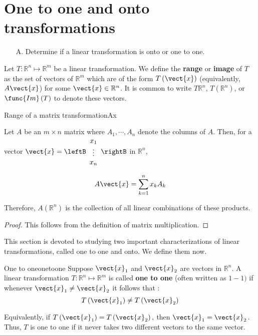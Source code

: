 \section{One to one and onto transformations}

\begin{outcome}
\begin{enumerate}
\item[A.]  Determine if a linear transformation is onto or one to one.
\end{enumerate}
\end{outcome}

Let $T: \mathbb{R}^n \mapsto \mathbb{R}^m$ be a linear transformation. We define the \textbf{range} or \textbf{image} of $T$ as the set of vectors of $\mathbb{R}^{m}$ which are of the form
$T \left(\vect{x}\right)$ (equivalently, $A\vect{x}$) for some $\vect{x}\in \mathbb{R}^{n}$. It is common
to write $T\mathbb{R}^{n}$, $T\left( \mathbb{R}^{n}\right)$, or
$\func{Im}\left( T\right) $ to denote these vectors.  

\begin{lemma}{Range of a matrix transformation}{Ax}

Let $A$ be an $m\times n$ matrix where $A_{1},\cdots , A_{n}$ denote the columns of
$A$. Then, for a vector $\vect{x}=\leftB 
\begin{array}{c}
x_{1} \\
\vdots \\
 x_{n}
\end{array}
\rightB$ in $\mathbb{R}^n$,

\begin{equation*}
A\vect{x}=\sum_{k=1}^{n}x_{k}A_{k}
\end{equation*}

Therefore, $A \left( \mathbb{R}^n \right)$ is the collection of all
linear combinations of these products.
\end{lemma}

\begin{proof}
This follows from the definition of matrix multiplication.
\end{proof}

This section is devoted to studying two important characterizations of linear transformations, called one to one and onto. We define them now. 

\begin{definition}{One to one}{onetoone}
Suppose $\vect{x}_1$ and $\vect{x}_2$ are vectors in $\mathbb{R}^n$. A linear transformation $T: \mathbb{R}^n \mapsto \mathbb{R}^m$ is called \textbf{one to one} (often written as $1-1)$ if whenever
 $\vect{x}_1 \neq \vect{x}_2$ it follows that :
\begin{equation*}
T\left( \vect{x}_1 \right) \neq T \left(\vect{x}_2\right)
\end{equation*}

Equivalently, if $T\left( \vect{x}_1 \right) =T\left( \vect{x}_2\right) ,$
then $\vect{x}_1 = \vect{x}_2$. Thus,  $T$ is one to one if it never takes two different
vectors to the same vector.
\end{definition}

